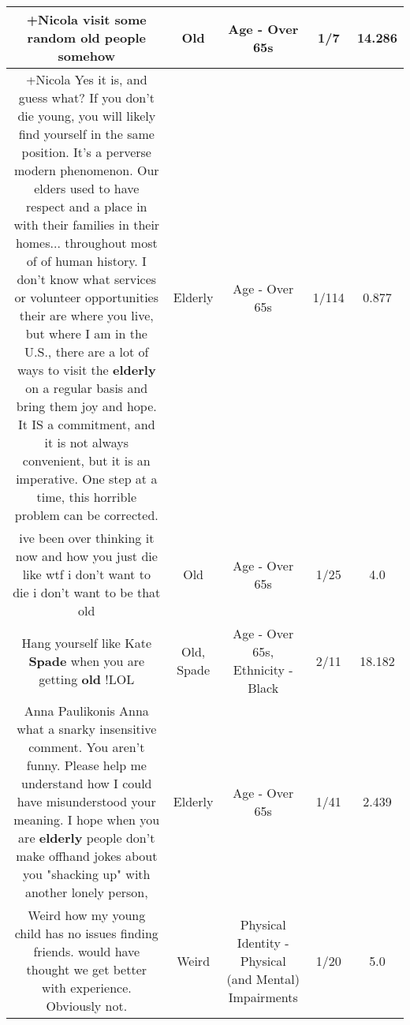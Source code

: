\documentclass[11pt]{article}
\newlength\mylength
\begin{document}
\begin{center}
\begin{longtable}{|C{.65\mylength}|C{.30\mylength}|C{.12\mylength}|C{.12\mylength}|C{.12\mylength}|}
  \small +Nicola visit some random \textbf{old} people somehow\normalsize   & Old & Age - Over 65s & 1/7 & 14.286 \\  \hline
  \small +Nicola Yes it is, and guess what? If you don't die young, you will likely find yourself in the same position. It's a perverse modern phenomenon. Our elders used to have respect and a place in with their families in their homes... throughout most of of human history.  I don't know what services or volunteer opportunities their are where you live, but where I am in the U.S., there are a lot of ways to visit the \textbf{elderly} on a regular basis and bring them joy and hope. It IS a commitment, and it is not always convenient, but it is an imperative. One step at a time, this horrible problem can be corrected.\normalsize   & Elderly & Age - Over 65s & 1/114 & 0.877 \\  \hline
  \small ive been over thinking it now and how you just die like wtf i don't want to die i don't want to be that old\normalsize   & Old & Age - Over 65s & 1/25 & 4.0 \\  \hline
  \small Hang yourself like Kate \textbf{Spade} when you are getting \textbf{old} !LOL\normalsize   & Old, Spade & Age - Over 65s, Ethnicity - Black & 2/11 & 18.182 \\  \hline
  \small Anna Paulikonis Anna what a snarky insensitive comment. You aren't funny. Please help me understand how I could have misunderstood your meaning. I hope when you are \textbf{elderly} people don't make offhand jokes about you "shacking up" with another lonely person,\normalsize   & Elderly & Age - Over 65s & 1/41 & 2.439 \\  \hline
  \small Weird how my young child has no issues finding friends. would have thought we get better with experience. Obviously not.\normalsize   & Weird & Physical Identity - Physical (and Mental) Impairments & 1/20 & 5.0 \\  \hline

\end{longtable}
\end{center}
\end{document}
